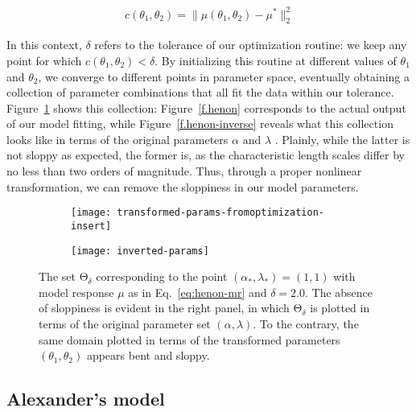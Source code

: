\documentclass{article}
\newcommand{\p}{\theta}
\newcommand{\omr}{\mu}
\newcommand{\ps}{\mathrm{\Theta}}
\begin{document}
\begin{align}
  c(\p_1, \p_2) = \| \omr(\p_1, \p_2) - \omr^* \|_2^2
\end{align}

In this context, $\delta$ refers to the tolerance of our optimization
routine: we keep any point for which $c(\p_1, \p_2) < \delta$. By
initializing this routine at different values of $\p_1$ and $\p_2$, we
converge to different points in parameter space, eventually obtaining
a collection of parameter combinations that all fit the data within
our tolerance.  Figure~\ref{f.transf-params} shows this collection:
Figure~\ref{f.henon} corresponds to the actual output of our model
fitting, while Figure~\ref{f.henon-inverse} reveals what this
collection looks like in terms of the original parameters $\alpha$ and
$\lambda$ . Plainly, while the latter is not sloppy as expected, the
former is, as the characteristic length scales differ by no less than
two orders of magnitude. Thus, through a proper nonlinear
transformation, we can remove the sloppiness in our model parameters.

%
\begin{figure}[ht!]
  \begin{subfigure}[t]{0.49\textwidth}
    \centering
    \texttt{[image: transformed-params-fromoptimization-insert]}
  \end{subfigure}
  \begin{subfigure}[t]{0.49\textwidth}
    \centering
    \texttt{[image: inverted-params]}
  \end{subfigure} %
  \caption{The set $\ps_\delta$ corresponding to the point
    $(\alpha_*,\lambda_*) = (1,1)$ with model response $\mu$ as in
    Eq.~\ref{eq:henon-mr} and $\delta = 2.0$. The absence of
    sloppiness is evident in the right panel, in which $\ps_\delta$ is
    plotted in terms of the original parameter set
    $(\alpha,\lambda)$. To the contrary, the same domain plotted in
    terms of the transformed parameters $(\p_1,\p_2)$ appears bent and
    sloppy. \label{f.transf-params}}
\end{figure}


\subsection{Alexander's model}
\end{document}
